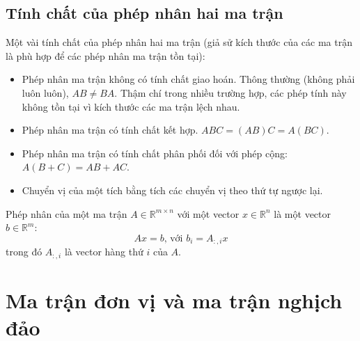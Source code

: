 \documentclass[12pt,a4paper]{report}
\begin{document}
\subsection{Tính chất của phép nhân hai ma trận}
Một vài tính chất của phép nhân hai ma trận (giả sử kích thước của các ma trận là phù hợp để các phép nhân ma trận tồn tại):
\begin{itemize}
	\item Phép nhân ma trận không có tính chất giao hoán. Thông thường (không phải luôn luôn), $AB \neq BA$. Thậm chí trong nhiều trường hợp, các phép tính này không tồn tại vì kích thước các ma trận lệch nhau.
	\item Phép nhân ma trận có tính chất kết hợp. $ABC = (AB)C = A(BC)$.
	\item Phép nhân ma trận có tính chất phân phối đối với phép cộng: $A(B + C) = AB + AC$.
	\item Chuyển vị của một tích bằng tích các chuyển vị theo thứ tự ngược lại. 
\end{itemize}
\noindent
Phép nhân của một ma trận $A \in \mathbb{R}^{m \times n}$ với một vector $x \in \mathbb{R}^{n}$ là một vector $b \in \mathbb{R}^m$:
\begin{equation}
Ax = b \text{, với } b_i = A_{:,i}x
\end{equation} trong đó $A_{:,i}$  là vector hàng thứ $i$ của $A$.
\section{Ma trận đơn vị và ma trận nghịch đảo}
\end{document}

